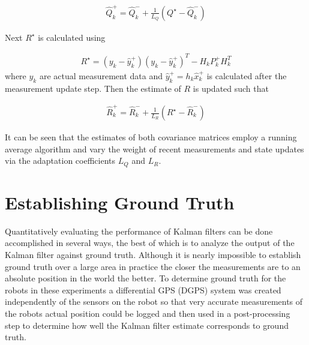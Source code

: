 \begin{align}
\label{eq:qadapt}
\hat{Q}_k^+ = \hat{Q}_k^- + \frac{1}{L_Q}\left(Q^\star-\hat{Q}_k^-\right)
\end{align}

Next $R^\star$ is calculated using

\begin{align*}
R^\star = \left(y_k-\hat{y}_k^+\right)\left(y_k-\hat{y}_k^+\right)^T - H_kP_k^+H_k^T
\end{align*}
where $y_k$ are actual measurement data and $\hat{y}_k^+ = h_k\hat{x}_k^+$ is calculated after the measurement update step. Then the estimate of $R$ is updated such that

\begin{align}
\label{eq:radapt}
\hat{R}_k^+ = \hat{R}_k^- + \frac{1}{L_R}\left(R^\star-\hat{R}_k^-\right)
\end{align}

It can be seen that the estimates of both covariance matrices employ a running average algorithm and vary the weight of recent measurements and state updates via the adaptation coefficients $L_Q$ and $L_R$.

\section{Establishing Ground Truth}
\label{sec:groundtruth}
Quantitatively evaluating the performance of Kalman filters can be done accomplished in several ways, the best of which is to analyze the output of the Kalman filter against ground truth. Although it is nearly impossible to establish ground truth over a large area in practice the closer the measurements are to an absolute position in the world the better. To determine ground truth for the robots in these experiments a differential GPS (DGPS) system was created independently of the sensors on the robot so that very accurate measurements of the robots actual position could be logged and then used in a post-processing step to determine how well the Kalman filter estimate corresponds to ground truth.

